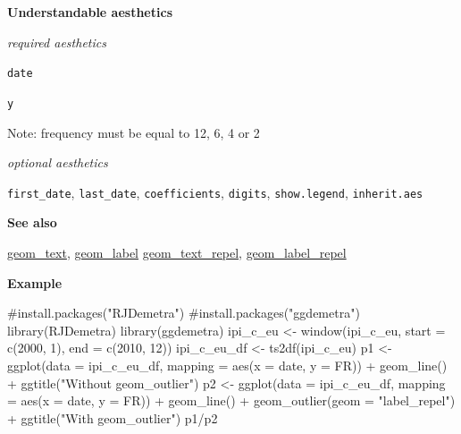 \documentclass[
  letterpaper,
  DIV=11,
  numbers=noendperiod]{scrreprt}
\newenvironment{Shaded}{\begin{snugshade}}{\end{snugshade}}
\newcommand{\AttributeTok}[1]{\textcolor[rgb]{0.40,0.45,0.13}{#1}}
\newcommand{\CommentTok}[1]{\textcolor[rgb]{0.37,0.37,0.37}{#1}}
\newcommand{\DecValTok}[1]{\textcolor[rgb]{0.68,0.00,0.00}{#1}}
\newcommand{\FunctionTok}[1]{\textcolor[rgb]{0.28,0.35,0.67}{#1}}
\newcommand{\NormalTok}[1]{\textcolor[rgb]{0.00,0.23,0.31}{#1}}
\newcommand{\OtherTok}[1]{\textcolor[rgb]{0.00,0.23,0.31}{#1}}
\newcommand{\SpecialCharTok}[1]{\textcolor[rgb]{0.37,0.37,0.37}{#1}}
\newcommand{\StringTok}[1]{\textcolor[rgb]{0.13,0.47,0.30}{#1}}
\begin{document}
\textbf{Understandable aesthetics}

\emph{required aesthetics}

\texttt{date}

\texttt{y}

Note: frequency must be equal to 12, 6, 4 or 2

\emph{optional aesthetics}

\texttt{first\_date}, \texttt{last\_date}, \texttt{coefficients},
\texttt{digits}, \texttt{show.legend}, \texttt{inherit.aes}

\textbf{See also}

\hyperref[text]{geom\_text}, \hyperref[label]{geom\_label}
\hyperref[text_repel]{geom\_text\_repel},
\hyperref[label_repel]{geom\_label\_repel}

\textbf{Example}

\begin{Shaded}
\begin{Highlighting}[]
\CommentTok{\#install.packages("RJDemetra")}
\CommentTok{\#install.packages("ggdemetra")}
\FunctionTok{library}\NormalTok{(RJDemetra)}
\FunctionTok{library}\NormalTok{(ggdemetra)}
\NormalTok{ipi\_c\_eu }\OtherTok{\textless{}{-}} \FunctionTok{window}\NormalTok{(ipi\_c\_eu, }\AttributeTok{start =} \FunctionTok{c}\NormalTok{(}\DecValTok{2000}\NormalTok{, }\DecValTok{1}\NormalTok{), }\AttributeTok{end =} \FunctionTok{c}\NormalTok{(}\DecValTok{2010}\NormalTok{, }\DecValTok{12}\NormalTok{))}
\NormalTok{ipi\_c\_eu\_df }\OtherTok{\textless{}{-}} \FunctionTok{ts2df}\NormalTok{(ipi\_c\_eu)}
\NormalTok{p1 }\OtherTok{\textless{}{-}} \FunctionTok{ggplot}\NormalTok{(}\AttributeTok{data =}\NormalTok{ ipi\_c\_eu\_df, }\AttributeTok{mapping =} \FunctionTok{aes}\NormalTok{(}\AttributeTok{x =}\NormalTok{ date, }\AttributeTok{y =}\NormalTok{ FR)) }\SpecialCharTok{+}
    \FunctionTok{geom\_line}\NormalTok{() }\SpecialCharTok{+} \FunctionTok{ggtitle}\NormalTok{(}\StringTok{"Without geom\_outlier"}\NormalTok{)}
\NormalTok{p2 }\OtherTok{\textless{}{-}} \FunctionTok{ggplot}\NormalTok{(}\AttributeTok{data =}\NormalTok{ ipi\_c\_eu\_df, }\AttributeTok{mapping =} \FunctionTok{aes}\NormalTok{(}\AttributeTok{x =}\NormalTok{ date, }\AttributeTok{y =}\NormalTok{ FR)) }\SpecialCharTok{+}
    \FunctionTok{geom\_line}\NormalTok{() }\SpecialCharTok{+} \FunctionTok{geom\_outlier}\NormalTok{(}\AttributeTok{geom =} \StringTok{"label\_repel"}\NormalTok{) }\SpecialCharTok{+} \FunctionTok{ggtitle}\NormalTok{(}\StringTok{"With geom\_outlier"}\NormalTok{)}
\NormalTok{p1}\SpecialCharTok{/}\NormalTok{p2}
\end{Highlighting}
\end{Shaded}
\end{document}
